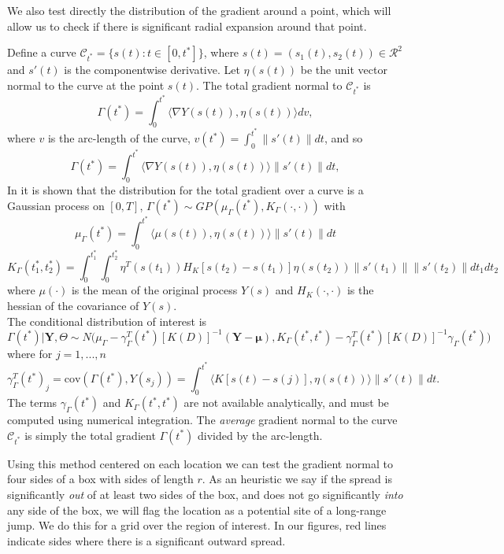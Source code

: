 \documentclass[12pt]{article}
\begin{document}
We also test directly the distribution of the gradient around a point, which will allow us to check if there is significant radial expansion around that point.

Define a curve $\mathcal{C}_{t^*} = \{ s(t): t \in [0,t^*] \}$, where $s(t) = \left( s_1(t), s_2(t) \right) \in \mathcal{R}^2$ and $s'(t)$ is the componentwise derivative. Let $\eta(s(t))$ be the unit vector normal to the curve at the point $s(t)$. The total gradient normal to $\mathcal{C}_{t^*}$ is
\[
\Gamma(t^*) = \int_0^{t^*} \langle \nabla Y(s(t)), \eta(s(t)) \rangle dv,
\]
where $v$ is the arc-length of the curve, $v(t^*) = \int_0^{t^*} \| s'(t) \| dt$, and so
\[
\Gamma(t^*) = \int_0^{t^*} \langle \nabla Y(s(t)), \eta(s(t)) \rangle \| s'(t) \| dt,
\]
In \cite{banerjee2006bayesian} it is shown that the distribution for the total gradient over a curve is a Gaussian process on $[0,T]$, $\Gamma(t^*) \sim GP( \mu_\Gamma(t^*), K_\Gamma(\cdot, \cdot) )$ with
\[
\mu_\Gamma(t^*) = \int_0^{t^*} \langle \mu(s(t)), \eta(s(t)) \rangle \| s'(t) \| dt
\]
\[
K_\Gamma(t_1^*, t_2^*) = \int_0^{t_1^*} \int_0^{t_2^*} \eta^T(s(t_1)) H_K\left[ s(t_2) - s(t_1) \right] \eta(s(t_2)) \| s'(t_1) \| \| s'(t_2) \| dt_1 dt_2
\]
where $\mu(\cdot)$ is the mean of the original process $Y(s)$ and $H_K(\cdot,\cdot)$ is the hessian of the covariance of $Y(s)$. \\

The conditional distribution of interest is
\[
\Gamma(t^*) | \textbf{Y},\Theta \sim N\big( \mu_\Gamma - \gamma^T_\Gamma(t^*) [K(D)]^{-1} (\textbf{Y} - \boldsymbol{\mu}),
K_\Gamma(t^*, t^*) - \gamma^T_\Gamma(t^*) [K(D)]^{-1} \gamma_\Gamma(t^*) \big)
\]
where for $j = 1,...,n$
\[
\gamma^T_\Gamma(t^*)_j = \text{cov}( \Gamma(t^*), Y(s_j) ) = \int_0^{t^*} \langle K \left[ s(t) - s(j) \right], \eta(s(t)) \rangle \| s'(t) \| dt.
\]
The terms $\gamma_\Gamma(t^*)$ and $K_\Gamma(t^*, t^*)$ are not available analytically, and must be computed using numerical integration. The {\it average} gradient normal to the curve $\mathcal{C}_{t^*}$ is simply the total gradient $\Gamma(t^*)$ divided by the arc-length.

Using this method centered on each location we can test the gradient normal to four sides of a box with sides of length $r$. As an heuristic we say if the spread is significantly {\it out} of at least two sides of the box, and does not go significantly {\it into} any side of the box, we will flag the location as a potential site of a long-range jump. We do this for a grid over the region of interest. In our figures, red lines indicate sides where there is a significant outward spread.
\end{document}
